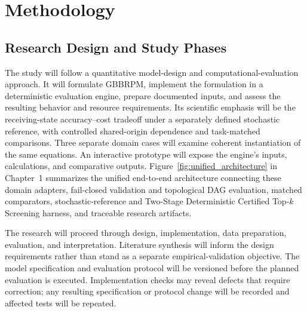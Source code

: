 \section{Methodology}\label{methodology}

\subsection{Research Design and Study Phases}\label{research-design}

The study will follow a quantitative model-design and computational-evaluation
approach. It will formulate GBBRPM, implement the formulation in a deterministic
evaluation engine, prepare documented inputs, and assess the resulting behavior
and resource requirements. Its scientific emphasis will be the receiving-state
accuracy--cost tradeoff under a separately defined stochastic reference,
with controlled shared-origin dependence and task-matched comparisons.
Three separate domain cases will examine coherent instantiation of the same equations. An interactive prototype will expose the
engine's inputs, calculations, and comparative outputs. Figure~\ref{fig:unified_architecture}
in Chapter~1 summarizes the unified end-to-end architecture connecting these
domain adapters, fail-closed validation and topological DAG evaluation,
matched comparators, stochastic-reference and Two-Stage Deterministic Certified
Top-$k$ Screening harness, and traceable research artifacts.

The research will proceed through design, implementation, data preparation,
evaluation, and interpretation. Literature synthesis will inform the design
requirements rather than stand as a separate empirical-validation objective.
The model specification and evaluation protocol will be versioned before the
planned evaluation is executed. Implementation checks may reveal defects that
require correction; any resulting specification or protocol change will be
recorded and affected tests will be repeated.

